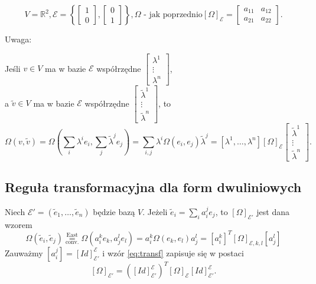 \documentclass[../main.tex]{subfiles}
\begin{document}
    \begin{przyklad}
        \[
            V = \mathbb{R}^2, \mathcal{E}=\left\{ \begin{bmatrix} 1\\0 \end{bmatrix} , \begin{bmatrix} 0\\1 \end{bmatrix}  \right\}, \Omega \text{ - jak poprzednio} \left[ \Omega \right]_\mathcal{E} = \begin{bmatrix} a_{11}&a_{12}\\a_{21}&a_{22} \end{bmatrix}
        .\]
        \begin{large}
            Uwaga:
        \end{large}
        Jeśli $v\in V$ ma w bazie $\mathcal{E}$ współrzędne $\begin{bmatrix} \lambda^1\\ \vdots\\ \lambda^n \end{bmatrix} $,\\
        a $\tilde v\in V$ ma w bazie $\mathcal{E}$ współrzędne $\begin{bmatrix} \tilde \lambda^1\\ \vdots \\ \tilde \lambda^n \end{bmatrix} $, to \[
            \Omega (v,\tilde v) = \Omega (\sum_i \lambda^i e_i, \sum_j \tilde \lambda^j e_j) = \sum_{i,j} \lambda^i \Omega (e_i,e_j)\tilde \lambda^j = \left[ \lambda^1,\ldots,\lambda^n \right] \left[ \Omega \right]_\mathcal{E} \begin{bmatrix} \tilde \lambda^1\\ \vdots\\ \tilde\lambda^n \end{bmatrix}
        .\]
    \end{przyklad}

    \subsection{Reguła transformacyjna dla form dwuliniowych}
    Niech $\mathcal{E}' = (\tilde e_1,\ldots,\tilde e_n)$ będzie bazą $ V$. Jeżeli $\tilde e_i = \sum_i a^j_i e_j$, to $\left[ \Omega \right]_{\mathcal{E}'}$ jest dana wzorem
    \begin{equation}\label{eq:transf}
        \Omega(\tilde e_i, \tilde e_j) \overset{\text{East}}{\underset{\text{conv.}}{=}} \Omega (a^k_i e_k, a^l_j e_l) = a^k_i \Omega (e_k, e_l)a^l_j = \left[ a^k_i \right]^T \left[ \Omega \right]_{\mathcal{E},k,l}\left[ a^l_j \right]
    \end{equation}
    Zauważmy $\left[ a^j_i \right] = \left[ Id \right]_{\mathcal{E}'}^\mathcal{E}$ i wzór \ref{eq:transf} zapisuje się w postaci
    \[
        \left[ \Omega \right] _{\mathcal{E}'} = \left( \left[ Id \right] _{\mathcal{E}'}^\mathcal{E} \right) ^T \left[ \Omega \right] _\mathcal{E} \left[ Id \right] _{\mathcal{E}'}^\mathcal{E}
    .\]
\end{document}
